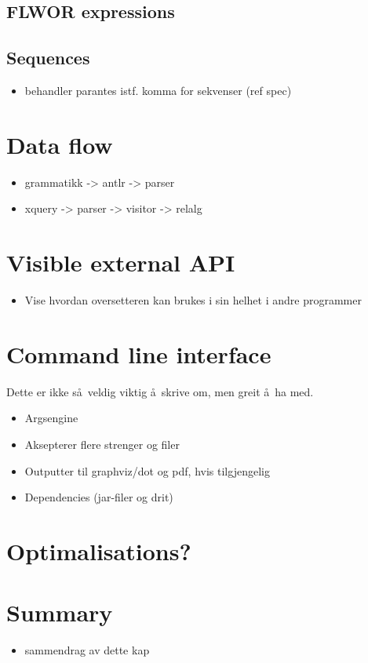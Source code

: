 \subsection{FLWOR expressions}
\subsection{Sequences}
\begin{itemize}
  \item behandler parantes istf. komma for sekvenser (ref spec) 
\end{itemize}

\section{Data flow}
\begin{itemize}
  \item grammatikk -> antlr -> parser
  \item xquery -> parser -> visitor -> relalg
\end{itemize}

\section{Visible external API}
\begin{itemize}
  \item Vise hvordan oversetteren kan brukes i sin helhet i andre programmer
\end{itemize}

\section{Command line interface}
Dette er ikke s\aa~veldig viktig \aa~skrive om, men greit \aa~ha med.
\begin{itemize}
  \item Argsengine
  \item Aksepterer flere strenger og filer
  \item Outputter til graphviz/dot og pdf, hvis tilgjengelig
  \item Dependencies (jar-filer og drit)
\end{itemize}

\section{Optimalisations?}

\section{Summary}
\label{sect:impl:summary}
\begin{itemize}
  \item sammendrag av dette kap
\end{itemize}